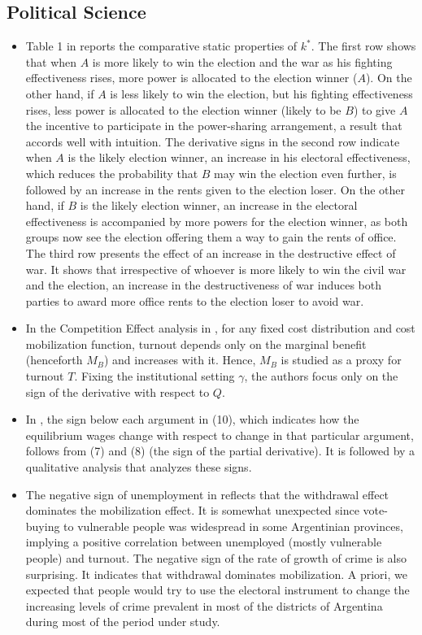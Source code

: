 \documentclass[11pt]{book}
\begin{document}
\subsection{Political Science}
\begin{itemize}
\item Table 1 in \cite{tridimas2011political} reports
the comparative static properties of $k^{*}$. The first row shows
that when $A$ is more likely to win the election and the war as his
fighting effectiveness rises, more power is allocated to the election
winner ($A$). On the other hand, if $A$ is less likely to win the
election, but his fighting effectiveness rises, less power is allocated
to the election winner (likely to be $B$) to give $A$ the incentive
to participate in the power-sharing arrangement, a result that accords
well with intuition. The derivative signs in the second row indicate
when $A$ is the likely election winner, an increase in his electoral
effectiveness, which reduces the probability that $B$ may win the
election even further, is followed by an increase in the rents given
to the election loser. On the other hand, if $B$ is the likely election
winner, an increase in the electoral effectiveness is accompanied
by more powers for the election winner, as both groups now see the
election offering them a way to gain the rents of office. The third
row presents the effect of an increase in the destructive effect of
war. It shows that irrespective of whoever is more likely to win the
civil war and the election, an increase in the destructiveness of
war induces both parties to award more office rents to the election
loser to avoid war.
\item In the Competition Effect analysis in \cite{herrera2016turnout},
for any fixed cost distribution and cost mobilization function, turnout
depends only on the marginal benefit (henceforth $M_{B}$) and increases
with it. Hence, $M_{B}$ is studied as a proxy for turnout $T$. Fixing
the institutional setting $\gamma$, the authors focus only on the
sign of the derivative with respect to $Q$.
\item In \cite{acharyya2017asymmetric},
the sign below each argument in (10), which indicates how the equilibrium
wages change with respect to change in that particular argument, follows
from (7) and (8) (the sign of the partial derivative). It is followed
by a qualitative analysis that analyzes these signs.
\item The negative sign of unemployment in \cite{justo2018liii}
reflects that the withdrawal effect dominates the mobilization effect.
It is somewhat unexpected since vote-buying to vulnerable people was
widespread in some Argentinian provinces, implying a positive correlation
between unemployed (mostly vulnerable people) and turnout. The negative
sign of the rate of growth of crime is also surprising. It indicates
that withdrawal dominates mobilization. A priori, we expected that
people would try to use the electoral instrument to change the increasing
levels of crime prevalent in most of the districts of Argentina during
most of the period under study.
\end{itemize}
\end{document}
